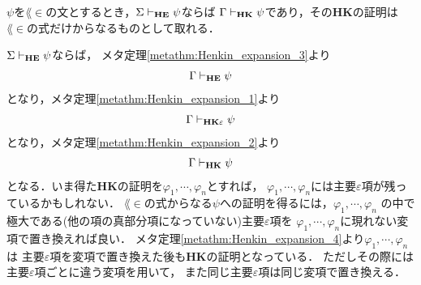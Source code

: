 	\begin{screen}
		\begin{metathm}
		\label{metathm:Henkin_expansion_HE_to_HK}
			$\psi$を$\lang{\in}$の文とするとき，$\Sigma \vdash_{{\scriptsize \mbox{{\bf HE}}}} \psi$ならば
			$\Gamma \vdash_{{\scriptsize \mbox{{\bf HK}}}} \psi$であり，その{\bf HK}の証明は
			$\lang{\in}$の式だけからなるものとして取れる．
		\end{metathm}
	\end{screen}
	
	\begin{sketch}
		$\Sigma \vdash_{{\scriptsize \mbox{{\bf HE}}}} \psi$ならば，
		メタ定理\ref{metathm:Henkin_expansion_3}より
		\begin{align}
			\Gamma \vdash_{{\scriptsize \mbox{{\bf HE}}}} \psi
		\end{align}
		となり，メタ定理\ref{metathm:Henkin_expansion_1}より
		\begin{align}
			\Gamma \vdash_{{\scriptsize \mbox{{\bf HK$\varepsilon$}}}} \psi
		\end{align}
		となり，メタ定理\ref{metathm:Henkin_expansion_2}より
		\begin{align}
			\Gamma \vdash_{{\scriptsize \mbox{{\bf HK}}}} \psi
		\end{align}
		となる．いま得た{\bf HK}の証明を$\varphi_{1},\cdots,\varphi_{n}$とすれば，
		$\varphi_{1},\cdots,\varphi_{n}$には主要$\varepsilon$項が残っているかもしれない．
		$\lang{\in}$の式からなる$\psi$への証明を得るには，$\varphi_{1},\cdots,\varphi_{n}$
		の中で極大である(他の項の真部分項になっていない)主要$\varepsilon$項を
		$\varphi_{1},\cdots,\varphi_{n}$に現れない変項で置き換えれば良い．
		メタ定理\ref{metathm:Henkin_expansion_4}より$\varphi_{1},\cdots,\varphi_{n}$は
		主要$\varepsilon$項を変項で置き換えた後も{\bf HK}の証明となっている．
		ただしその際には主要$\varepsilon$項ごとに違う変項を用いて，
		また同じ主要$\varepsilon$項は同じ変項で置き換える．
		\QED
	\end{sketch}